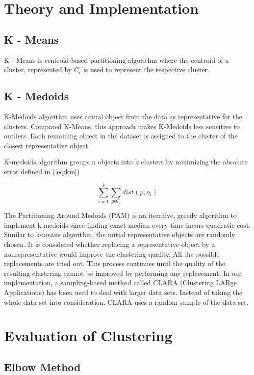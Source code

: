 \documentclass[12pt]{article}
\begin{document}
\section{Theory and Implementation}
\subsection{K - Means}
K - Means is centroid-based partitioning algorithm where the centroid of a cluster, represented by $C_i$ is used to represent the respective cluster.

\subsection{K - Medoids}
K-Medoids algorithm uses actual object from the data as representative for the clusters. Compared K-Means, this approach makes K-Medoids less sensitive to outliers. Each remaining object in the dataset is assigned to the cluster of the closest representative object.

K-medoids algorithm groups n objects into k clusters by minimizing the absolute error defined in (\ref{eq:km})

\begin{equation}
\label{eq:km}
 \sum_{i=1}^{k} \sum_{p \epsilon C_i} dist(p,o_i)
\end{equation}

The Partitioning Around Medoids (PAM) is an iterative, greedy
algorithm to implement k medoids since finding exact median every time incurs quadratic cost. Similar to k-means algorithm, the initial representative objects are randomly
chosen. It is considered whether replacing a representative object by a nonrepresentative
 would improve the clustering quality. All the possible replacements
are tried out. This process continues until the quality of the resulting clustering cannot be improved by performing any replacement. In our implementation,  a sampling-based method called CLARA (Clustering LARge Applications) has been used to deal with larger data sets. Instead of taking the whole data set into consideration, CLARA uses a random sample of the data set.

\section{Evaluation of Clustering}

\subsection{Elbow Method}
\end{document}
